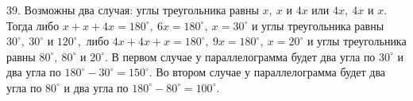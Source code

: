 39. Возможны два случая: углы треугольника равны $x,\ x$ и $4x$ или $4x,\ 4x$ и $x.$ Тогда либо $x+x+4x=180^\circ,\ 6x=180^\circ,\ x=30^\circ$ и углы треугольника равны $30^\circ,\ 30^\circ$  и $120^\circ,$ либо $4x+4x+x=180^\circ,\ 9x=180^\circ,\ x=20^\circ$ и углы треугольника равны $80^\circ,\ 80^\circ$ и $20^\circ.$ В первом случае у параллелограмма будет два угла по $30^\circ$ и два угла по $180^\circ-30^\circ=150^\circ.$ Во втором случае у параллелограмма будет два угла по $80^\circ$ и два угла по $180^\circ-80^\circ=100^\circ.$\\
